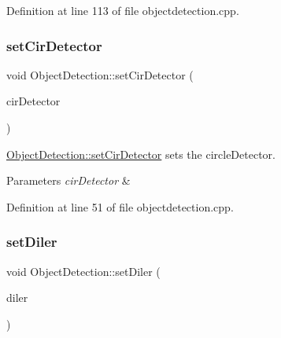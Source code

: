 Definition at line 113 of file objectdetection.\+cpp.

\mbox{\label{class_image_processor_1_1_object_detection_afb439c3f4c9bb2e084674ce34e965430}} 
\subsubsection{\texorpdfstring{set\+Cir\+Detector}{setCirDetector}}
{\footnotesize\ttfamily void Object\+Detection\+::set\+Cir\+Detector (\begin{DoxyParamCaption}\item[{\hyperlink{class_image_processor_1_1_detect_circle}{Detect\+Circle} $\ast$}]{cir\+Detector }\end{DoxyParamCaption})\hspace{0.3cm}{\ttfamily [slot]}}



\hyperlink{class_image_processor_1_1_object_detection_afb439c3f4c9bb2e084674ce34e965430}{Object\+Detection\+::set\+Cir\+Detector} sets the circle\+Detector. 


\begin{DoxyParams}{Parameters}
{\em cir\+Detector} & \\
\hline
\end{DoxyParams}


Definition at line 51 of file objectdetection.\+cpp.

\mbox{\label{class_image_processor_1_1_object_detection_a727fcf4d318c9a3ccb63348b957c1e94}} 
\subsubsection{\texorpdfstring{set\+Diler}{setDiler}}
{\footnotesize\ttfamily void Object\+Detection\+::set\+Diler (\begin{DoxyParamCaption}\item[{\hyperlink{class_image_processor_1_1_dilate}{Dilate} $\ast$}]{diler }\end{DoxyParamCaption})\hspace{0.3cm}{\ttfamily [slot]}}




